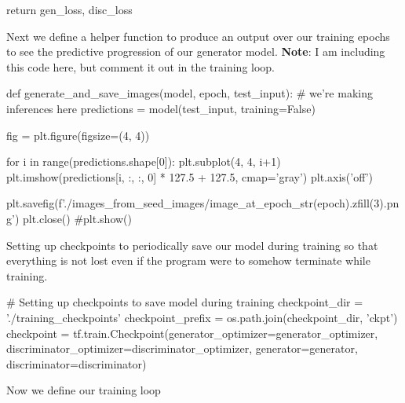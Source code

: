 \documentclass[%
oneside,                 %
final,                   %
10pt]{article}
\begin{document}
    return gen_loss, disc_loss

\epycod


Next we define a helper function to produce an output over our training epochs
to see the predictive progression of our generator model. \textbf{Note}: I am including
this code here, but comment it out in the training loop.















\bpycod
def generate_and_save_images(model, epoch, test_input):
    # we're making inferences here
    predictions = model(test_input, training=False)

    fig = plt.figure(figsize=(4, 4))

    for i in range(predictions.shape[0]):
        plt.subplot(4, 4, i+1)
        plt.imshow(predictions[i, :, :, 0] * 127.5 + 127.5, cmap='gray')
        plt.axis('off')

    plt.savefig(f'./images_from_seed_images/image_at_epoch_{str(epoch).zfill(3)}.png')
    plt.close()
    #plt.show()

\epycod


Setting up checkpoints to periodically save our model during training so that
everything is not lost even if the program were to somehow terminate while
training.









\bpycod
# Setting up checkpoints to save model during training
checkpoint_dir = './training_checkpoints'
checkpoint_prefix = os.path.join(checkpoint_dir, 'ckpt')
checkpoint = tf.train.Checkpoint(generator_optimizer=generator_optimizer,
                            discriminator_optimizer=discriminator_optimizer,
                            generator=generator,
                            discriminator=discriminator)

\epycod


Now we define our training loop
\end{document}
